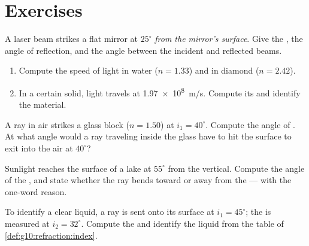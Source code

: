 \section{Exercises}

\begin{exercise}[$\star$]\label{exo:g10:refraction:1}
A laser beam strikes a flat mirror at $25^\circ$ \emph{from the mirror's
surface}. Give the , the angle of reflection, and the
angle between the incident and reflected beams.
\end{exercise}

\begin{exercise}[$\star$]\label{exo:g10:refraction:2}
\begin{enumerate}
  \item Compute the speed of light in water ($n = 1.33$) and in diamond
        ($n = 2.42$).
  \item In a certain solid, light travels at \qty{1.97e8}{m/s}. Compute
        its  and identify the material.
\end{enumerate}
\end{exercise}

\begin{exercise}[$\star$]\label{exo:g10:refraction:3}
A ray in air strikes a glass block ($n = 1.50$) at $i_1 = 40^\circ$.
Compute the angle of . At what angle would a ray traveling
inside the glass have to hit the surface to exit into the air at
$40^\circ$?
\end{exercise}

\begin{exercise}[$\star$]\label{exo:g10:refraction:4}
Sunlight reaches the surface of a lake at $55^\circ$ from the vertical.
Compute the angle of the , and state whether the ray bends
toward or away from the  --- with the one-word reason.
\end{exercise}

\begin{exercise}[$\star$]\label{exo:g10:refraction:5}
To identify a clear liquid, a ray is sent onto its surface at
$i_1 = 45^\circ$; the  is measured at $i_2 = 32^\circ$.
Compute the  and identify the liquid from the table of
\cref{def:g10:refraction:index}.
\end{exercise}

